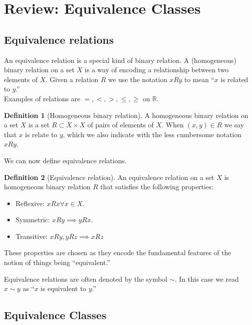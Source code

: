 \documentclass{book}
\theoremstyle{definition}
\newtheorem{defn}{Definition}[section]
\begin{document}
\newpage


\section{Review: Equivalence Classes}


\subsection{Equivalence relations}


An equivalence relation is a special kind of binary relation. A
(homogeneous) binary relation on a set $X$ is a way of encoding a relationship between two elements of $X$. Given a relation $R$ we use the notation $xRy$ to mean ``$x$ is related to $y$.'' \\

Examples of relations are $=,<,>, \leq, \geq$ on $\mathbb{R}$. \\

\begin{defn}[Homogeneous binary relation]
	A homogeneous binary relation on a set $X$ is a set $R \subset X \times X$ of pairs of
	elements of $X$. When $(x,y) \in R$ we say that $x$ is relate to $y$, which we also indicate with the less cumbersome notation $xRy$.  
\end{defn}

We can now define equivalence relations.



\begin{defn}[Equivalence relation]
	An equivalence relation on a set $X$ is homogeneous binary relation $R$ that satisfies the following properties:
	\begin{itemize}
		\item Reflexive: $xRx \forall x\in X$.
		\item Symmetric: $xRy \implies yRx$.
		\item Transitive: $xRy, yRz \implies xRz$
	\end{itemize}
	These properties are chosen as they encode the fundamental features of the notion of
	things being ``equivalent.''
\end{defn}

Equivalence relations are often denoted by the symbol $\sim$. In this case we read $x\sim y$ as ``$x$ is equivalent to $y$.'' 





\subsection{Equivalence Classes}
\end{document}
